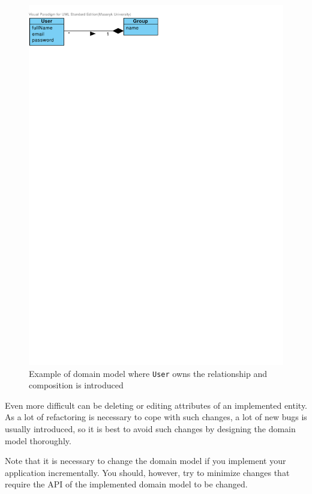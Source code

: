 \begin{figure}[h]
    \centering
        \includegraphics[trim=0 740 290 30, clip, keepaspectratio]{./images/user-owner-group-example.pdf}
    \caption{Example of domain model where \texttt{User} owns the relationship and composition is introduced}
    \label{fig:user-owner-group-example}
\end{figure}

Even more difficult can be deleting or editing attributes of an implemented entity. As a lot of refactoring is necessary to cope with such changes, a lot of new bugs is usually introduced, so it is best to avoid such changes by designing the domain model thoroughly.

Note that it is necessary to change the domain model if you implement your application incrementally. You should, however, try to minimize changes that require the API of the implemented domain model to be changed.

